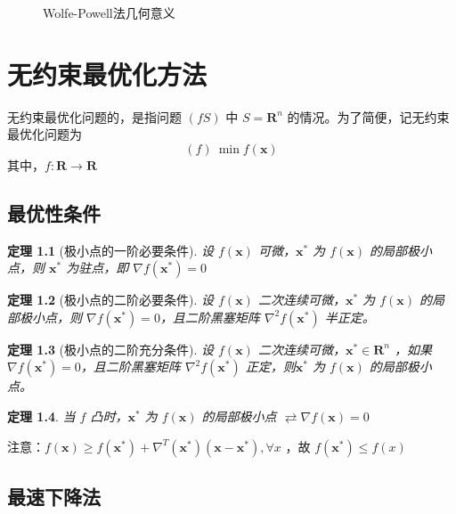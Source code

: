 \documentclass{book}
\newtheorem{theorem}{定理}[chapter]
\begin{document}
\begin{figure}[ht]
    \centering
    
    \caption{Wolfe-Powell法几何意义}
    \label{fig:Axis of Wolfe-Powell method}
\end{figure}

\chapter{无约束最优化方法}

无约束最优化问题的，是指问题 $(fS)$ 中 $S=\mathbf{R}^n$ 的情况。为了简便，记无约束最优化问题为
$$
    (f)\ \min f(\boldsymbol{x})
$$
其中，$f:\mathbf{R}\rightarrow\mathbf{R}$

\section{最优性条件}

\begin{theorem}[极小点的一阶必要条件]
    设 $f(\boldsymbol{x})$ 可微，$\boldsymbol{x}^*$ 为 $f(\boldsymbol{x})$ 的局部极小点，则 $\boldsymbol{x}^*$ 为驻点，即 $\nabla f(\boldsymbol{x}^*)=0$
\end{theorem}

\begin{theorem}[极小点的二阶必要条件]
    设 $f(\boldsymbol{x})$ 二次连续可微，$\boldsymbol{x}^*$ 为 $f(\boldsymbol{x})$ 的局部极小点，则 $\nabla f(\boldsymbol{x}^*)=0$，且二阶黑塞矩阵 $\nabla^2 f(\boldsymbol{x}^*)$ 半正定。
\end{theorem}

\begin{theorem}[极小点的二阶充分条件]
    设 $f(\boldsymbol{x})$ 二次连续可微，$\boldsymbol{x}^*\in \mathbf{R}^n$ ，如果$\nabla f(\boldsymbol{x}^*)=0$，且二阶黑塞矩阵 $\nabla^2 f(\boldsymbol{x}^*)$ 正定，则$\boldsymbol{x}^*$ 为 $f(\boldsymbol{x})$ 的局部极小点。
\end{theorem}

\begin{theorem}
    当 $f$ 凸时，$\boldsymbol{x}^*$ 为 $f(\boldsymbol{x})$ 的局部极小点 $\rightleftarrows \nabla f(\boldsymbol{x})=0$
\end{theorem}

注意：$f(\boldsymbol{x})\ge f(\boldsymbol{x}^*)+\nabla^T(\boldsymbol{x}^*)(\boldsymbol{x}-\boldsymbol{x}^*),\forall x$ ，故 $f(\boldsymbol{x}^*)\le f(x)$

\section{最速下降法}
\end{document}
